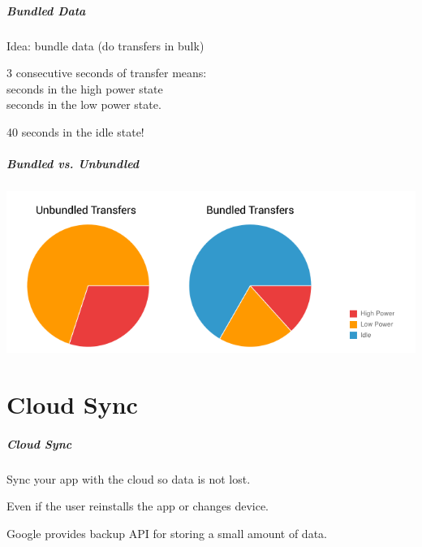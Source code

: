 \begin{frame}
\frametitle{Bundled Data}

\begin{changemargin}{1cm}

Idea: bundle data (do transfers in bulk)

3 consecutive seconds of transfer means:\\
 seconds in the high power state\\
 seconds in the low power state.

40 seconds in the idle state!

\end{changemargin}
\end{frame}

\begin{frame}
\frametitle{Bundled vs. Unbundled}

\includegraphics[width=\textwidth]{images/batteryusage.png}\\

\end{frame}

\part{Cloud Sync}
\frame{\partpage}

\begin{frame}
\frametitle{Cloud Sync}

\begin{changemargin}{1cm}

Sync your app with the cloud so data is not lost.

Even if the user reinstalls the app or changes device.

Google provides backup API for storing a small amount of data.

\end{changemargin}
\end{frame}

